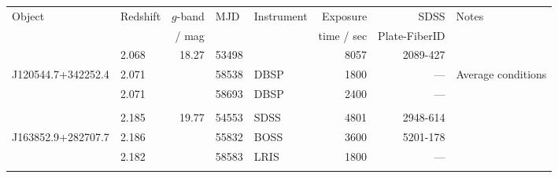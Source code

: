\documentclass[fleqn,usenatbib]{mnras}
\begin{document}
\begin{table}
  \centering
  \begin{tabular}{l l   r ll  r r l}
    \hline 
    \hline 
    \multirow{2}{*}{Object} & \multirow{2}{*}{Redshift} & $g$-band & \multirow{2}{*}{MJD} & \multirow{3}{*}{Instrument} & Exposure      &   SDSS               & \multirow{2}{*}{Notes} \\
                                         &                                        &   / mag      &                                 &                                             &  time / sec &   Plate-FiberID  & \\
    \hline  
                                       & 2.068                              & 18.27          &  53498                   & SDSS                                     &  8057            & 2089-427             & \\
 J120544.7+342252.4     & 2.071                             &                    &  58538                   & DBSP                                     &  1800            &  ---                      &  Average conditions \\
                                       & 2.071                             &                     &  58693                  & DBSP                                      &  2400            &  ---                      &          \\
                                       &                                       &                     &                               &                                              &                      &                               &                               \\
                                      & 2.185                              & 19.77           &  54553                   & SDSS                                     &   4801            &  2948-614              & \\
J163852.9+282707.7     & 2.186                              &                    &  55832                     & BOSS                                    &   3600            &  5201-178            & \\
                                      & 2.182                              &                     &  58583                     & LRIS                                    &  1800              &  ---                      & \\
                                      &                                         &                    &                                 &                                            &                      &                              &                                 \\

\end{tabular}
\end{table}
\end{document}
